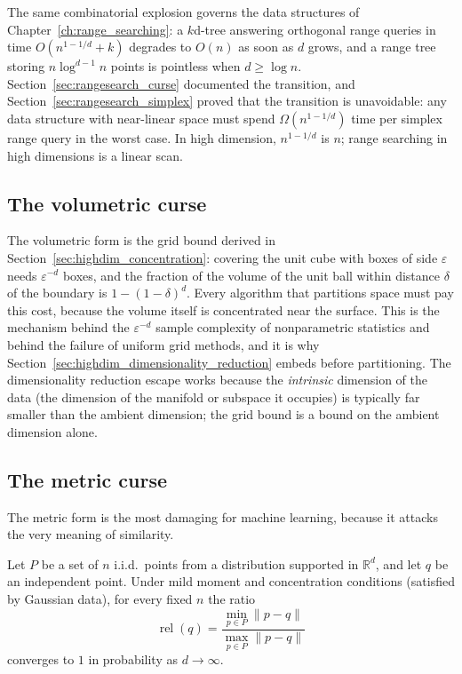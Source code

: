 The same combinatorial explosion governs the data structures of
Chapter~\ref{ch:range_searching}: a $k$d-tree answering orthogonal range
queries in time $O(n^{1-1/d} + k)$ degrades to $O(n)$ as soon as $d$ grows,
and a range tree storing $n \log^{d-1} n$ points is pointless when $d \ge
\log n$. Section~\ref{sec:rangesearch_curse} documented the transition, and
Section~\ref{sec:rangesearch_simplex} proved that the transition is
unavoidable: any data structure with near-linear space must spend
$\Omega(n^{1-1/d})$ time per simplex range query in the worst case. In high
dimension, $n^{1-1/d}$ is $n$; range searching in high dimensions is a linear
scan.

\subsection{The volumetric curse}

The volumetric form is the grid bound derived in
Section~\ref{sec:highdim_concentration}: covering the unit cube with boxes of
side $\varepsilon$ needs $\varepsilon^{-d}$ boxes, and the fraction of the
volume of the unit ball within distance $\delta$ of the boundary is
$1 - (1-\delta)^d$. Every algorithm that partitions space must pay this cost,
because the volume itself is concentrated near the surface. This is the 
mechanism behind the $\varepsilon^{-d}$ sample complexity of nonparametric
statistics and behind the failure of uniform grid methods, and it is why
Section~\ref{sec:highdim_dimensionality_reduction} embeds before
partitioning. The dimensionality reduction escape works because the
\emph{intrinsic} dimension of the data (the dimension of the manifold or
subspace it occupies) is typically far smaller than the ambient dimension;
the grid bound is a bound on the ambient dimension alone.

\subsection{The metric curse}

The metric form is the most damaging for machine learning, because it attacks
the very meaning of similarity.

\begin{theorem}
\label{thm:highdim_distance_concentration}
Let $P$ be a set of $n$ i.i.d.\ points from a distribution supported in
$\mathbb{R}^d$, and let $q$ be an independent point. Under mild moment and
concentration conditions (satisfied by Gaussian data), for every fixed
$n$ the ratio
\[
\operatorname{rel}(q) = \frac{\min_{p \in P} \|p - q\|}{\max_{p \in P} \|p - q\|}
\]
converges to $1$ in probability as $d \to \infty$.
\end{theorem}

